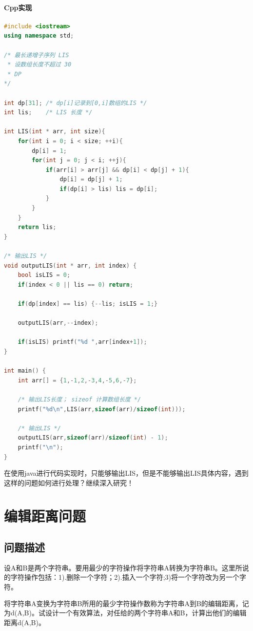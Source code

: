 \documentclass[UTF8]{ctexart}
\begin{document}
    \paragraph{Cpp实现}

\begin{small}
\begin{lstlisting}[language=c++]
#include <iostream>
using namespace std;

/* 最长递增子序列 LIS
 * 设数组长度不超过 30
 * DP
*/

int dp[31]; /* dp[i]记录到[0,i]数组的LIS */
int lis;    /* LIS 长度 */

int LIS(int * arr, int size){
    for(int i = 0; i < size; ++i){
        dp[i] = 1;
        for(int j = 0; j < i; ++j){
            if(arr[i] > arr[j] && dp[i] < dp[j] + 1){
                dp[i] = dp[j] + 1;
                if(dp[i] > lis) lis = dp[i];
            }
        }
    }
    return lis;
}

/* 输出LIS */
void outputLIS(int * arr, int index) {
    bool isLIS = 0;
    if(index < 0 || lis == 0) return;

    if(dp[index] == lis) {--lis; isLIS = 1;}

    outputLIS(arr,--index);

    if(isLIS) printf("%d ",arr[index+1]);
}

int main() {
    int arr[] = {1,-1,2,-3,4,-5,6,-7};

    /* 输出LIS长度； sizeof 计算数组长度 */
    printf("%d\n",LIS(arr,sizeof(arr)/sizeof(int)));

    /* 输出LIS */
    outputLIS(arr,sizeof(arr)/sizeof(int) - 1);
    printf("\n");
}
\end{lstlisting}
\end{small}

    在使用java进行代码实现时，只能够输出LIS，但是不能够输出LIS具体内容，遇到这样的问题如何进行处理？继续深入研究！

    \section{编辑距离问题}
    \subsection{问题描述}
    设A和B是两个字符串。要用最少的字符操作将字符串A转换为字符串B。这里所说的字符操作包括：1).删除一个字符；2).插入一个字符;3)将一个字符改为另一个字符。

    将字符串A变换为字符串B所用的最少字符操作数称为字符串A到B的编辑距离，记为d(A,B)。试设计一个有效算法，对任给的两个字符串A和B，计算出他们的编辑距离d(A,B)。
\end{document}

